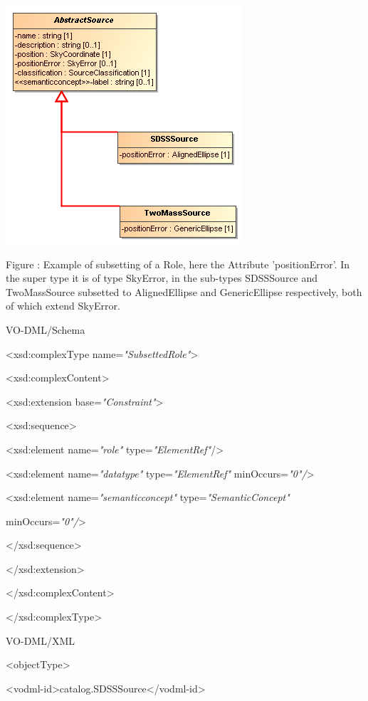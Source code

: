\documentclass[10pt,a4paper]{ivoa}
\begin{document}
\includegraphics[width=3.46875in,height=3.48958in]{./media/image22.png}

Figure : Example of subsetting of a Role, here the Attribute
'positionError'. In the super type it is of type SkyError, in the
sub-types SDSSSource and TwoMassSource subsetted to AlignedEllipse and
GenericEllipse respectively, both of which extend SkyError.

VO-DML/Schema

\textless xsd:complexType name=\emph{"SubsettedRole"}\textgreater{}

\textless xsd:complexContent\textgreater{}

\textless xsd:extension base=\emph{"Constraint"}\textgreater{}

\textless xsd:sequence\textgreater{}

\textless xsd:element name=\emph{"role"}
type=\emph{"ElementRef"}/\textgreater{}

\textless xsd:element name=\emph{"datatype"} type=\emph{"ElementRef"}
minOccurs=\emph{"0"/}\textgreater{}

\textless xsd:element name=\emph{"semanticconcept"}
type=\emph{"SemanticConcept"}

minOccurs=\emph{"0"/}\textgreater{}

\textless/xsd:sequence\textgreater{}

\textless/xsd:extension\textgreater{}

\textless/xsd:complexContent\textgreater{}

\textless/xsd:complexType\textgreater{}

VO-DML/XML

\textless objectType\textgreater{}

\textless vodml-id\textgreater catalog.SDSSSource\textless/vodml-id\textgreater{}
\end{document}
